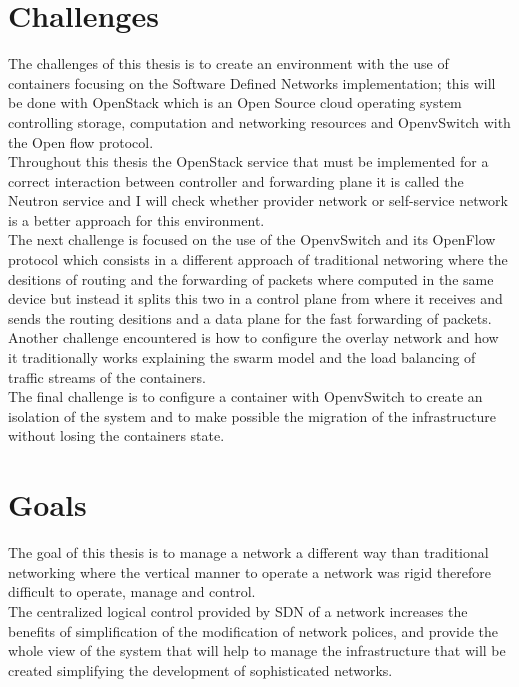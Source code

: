 \section{Challenges}
 
The challenges of this thesis is to create an environment with the use of containers focusing on the Software Defined Networks implementation; this will be done with OpenStack which is an Open Source cloud operating system controlling storage, computation and networking resources and OpenvSwitch with the Open flow protocol.\\

Throughout this thesis the OpenStack service that must be implemented for a correct interaction between controller and forwarding plane it is called the Neutron service and I will check whether provider network or self-service network is a better approach for this environment.\\

The next challenge is focused on the use of the OpenvSwitch and its OpenFlow protocol which consists in a different approach of traditional networing where the desitions of routing and the forwarding of packets where computed in the same device but instead it splits this two in a control plane from where it receives and sends the routing desitions and a data plane for the fast forwarding of packets.\\

Another challenge encountered is how to configure the overlay network and how it traditionally works explaining the swarm model and the load balancing of traffic streams of the containers.\\

The final challenge is to configure a container with OpenvSwitch to create an isolation of the system and to make possible the migration of the infrastructure without losing the containers state.\\
 
\section{Goals}
 
 
The goal of this thesis is to manage a network a different way than traditional networking where the vertical manner to operate a network was rigid therefore difficult to operate, manage and control.\\

The centralized logical control provided by SDN of a network increases the benefits of simplification of the modification of network polices, and provide the whole view of the system that will help to manage the infrastructure that will be created simplifying the development of sophisticated networks.\\
 
